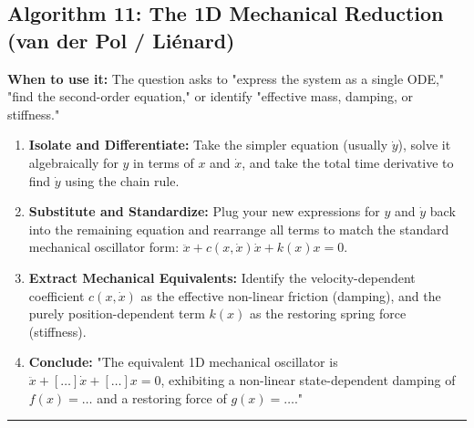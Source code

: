 \documentclass[11pt, a4paper]{report}
\begin{document}
\subsection*{Algorithm 11: The 1D Mechanical Reduction (van der Pol / Liénard)}
\textbf{When to use it:} The question asks to "express the system as a single ODE," "find the second-order equation," or identify "effective mass, damping, or stiffness."
\begin{enumerate}[label=\textbf{\arabic*.}]
    \item \textbf{Isolate and Differentiate:} Take the simpler equation (usually $\dot{y}$), solve it algebraically for $y$ in terms of $x$ and $\dot{x}$, and take the total time derivative to find $\dot{y}$ using the chain rule.
    \item \textbf{Substitute and Standardize:} Plug your new expressions for $y$ and $\dot{y}$ back into the remaining equation and rearrange all terms to match the standard mechanical oscillator form: $\ddot{x} + c(x,\dot{x})\dot{x} + k(x)x = 0$.
    \item \textbf{Extract Mechanical Equivalents:} Identify the velocity-dependent coefficient $c(x,\dot{x})$ as the effective non-linear friction (damping), and the purely position-dependent term $k(x)$ as the restoring spring force (stiffness).
    \item \textbf{Conclude:} "The equivalent 1D mechanical oscillator is $\ddot{x} + [\dots]\dot{x} + [\dots]x = 0$, exhibiting a non-linear state-dependent damping of $f(x) = \dots$ and a restoring force of $g(x) = \dots$."
\end{enumerate}
\vspace{1em}
\noindent\rule{\textwidth}{0.4pt}
\vspace{1em}
\end{document}
